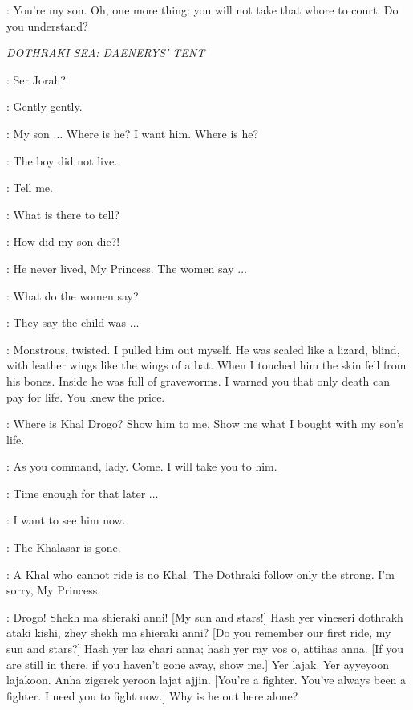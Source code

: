 \TYWIN: You're my son. Oh, one more thing: you will not take that whore to court. Do you understand? 


\scene

\textit{DOTHRAKI SEA: DAENERYS' TENT}


\DAENERYS: Ser Jorah? 

\JORAH: Gently gently. 

\DAENERYS: My son $\ldots$ Where is he? I want him. Where is he? 

\JORAH: The boy did not live. 

\DAENERYS: Tell me. 

\JORAH: What is there to tell? 

\DAENERYS: How did my son die?! 

\JORAH: He never lived, My Princess. The women say $\ldots$ 

\DAENERYS: What do the women say? 

\JORAH: They say the child was $\ldots$  

\MIRRI: Monstrous, twisted. I pulled him out myself. He was scaled like a lizard, blind, with leather wings like the wings of a bat. When I touched him the skin fell from his bones. Inside he was full of graveworms. I warned you that only death can pay for life. You knew the price. 

\DAENERYS: Where is Khal Drogo? Show him to me. Show me what I bought with my son's life. 

\MIRRI: As you command, lady. Come. I will take you to him. 

\JORAH: Time enough for that later $\ldots$  

\DAENERYS: I want to see him now. 


\DAENERYS: The Khalasar is gone. 

\JORAH: A Khal who cannot ride is no Khal. The Dothraki follow only the strong. I'm sorry, My Princess. 

\DAENERYS: Drogo! Shekh ma shieraki anni! [My sun and stars!] Hash yer vineseri dothrakh ataki kishi, zhey shekh ma shieraki anni? [Do you remember our first ride, my sun and stars?] Hash yer laz chari anna; hash yer ray vos o, attihas anna. [If you are still in there, if you haven't gone away, show me.] Yer lajak. Yer ayyeyoon lajakoon. Anha zigerek yeroon lajat ajjin. [You're a fighter. You've always been a fighter. I need you to fight now.] Why is he out here alone? 


